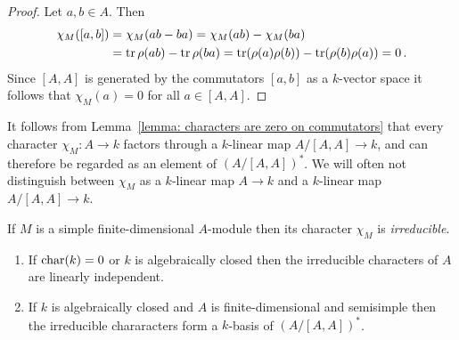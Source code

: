 \begin{proof}
  Let $a, b \in A$.
  Then
  \begin{align*}
        \chi_M([a,b])
    &=  \chi_M(ab - ba)
     =  \chi_M(ab) - \chi_M(ba) \\
    &=  \operatorname{tr} \rho(ab) - \operatorname{tr} \rho(ba)
     =  \operatorname{tr}( \rho(a) \rho(b) ) - \operatorname{tr}( \rho(b) \rho(a) )
     =  0 \,.
  \end{align*}
  Since $[A,A]$ is generated by the commutators $[a,b]$ as a $k$-vector space it follows that $\chi_M(a) = 0$ for all $a \in [A,A]$.
\end{proof}


\begin{fluff}
  It follows from Lemma~\ref{lemma: characters are zero on commutators} that every character $\chi_M \colon A \to k$ factors through a $k$-linear map $A/[A,A] \to k$, and can therefore be regarded as an element of $(A/[A,A])^*$.
  We will often not distinguish between $\chi_M$ as a $k$-linear map $A \to k$ and a $k$-linear map $A/[A,A] \to k$.
\end{fluff}


\begin{definition}
  If $M$ is a simple finite-dimensional $A$-module then its character $\chi_M$ is \emph{irreducible}.
\end{definition}


\begin{theorem}
  \leavevmode
  \label{theorem: characters as a basis}
  \begin{enumerate}
    \item
      \label{enumerate: characters are linearly independent}
      If $\operatorname{char}(k) = 0$ or $k$ is algebraically closed then the irreducible characters of $A$ are linearly independent.
    \item
      If $k$ is algebraically closed and $A$ is finite-dimensional and semisimple then the irreducible chararacters form a $k$-basis of $(A/[A,A])^*$.
  \end{enumerate}
\end{theorem}


